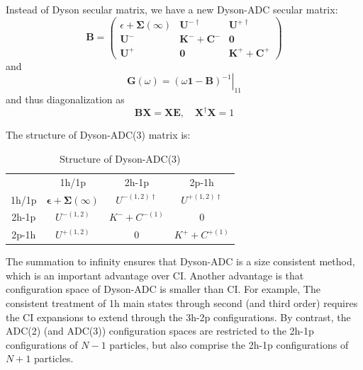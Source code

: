 Instead of Dyson secular matrix, we have a new Dyson-ADC secular matrix:
\begin{equation}
	\boldsymbol{B}=\left( \begin{array}{ccc}{\epsilon+\mathbf{\Sigma}(\infty)} & {\boldsymbol{U}^{-\dagger}} & {\boldsymbol{U}^{+\dagger}} \\ {\boldsymbol{U}^{-}} & {\boldsymbol{K}^{-}+\boldsymbol{C}^{-}} & {\mathbf{0}} \\ {\boldsymbol{U}^{+}} & {\boldsymbol{0}} & {\boldsymbol{K}^{+}+\boldsymbol{C}^{+}}\end{array}\right)
\end{equation}
and
\begin{equation}
	\boldsymbol{G}(\omega)=\left.(\omega \mathbf{1}-\boldsymbol{B})^{-1}\right|_{11}
\end{equation}
and thus diagonalization as
\begin{equation}
	\boldsymbol{B} \boldsymbol{X}=\boldsymbol{X} \boldsymbol{E}, \quad \boldsymbol{X}^{\dagger} \boldsymbol{X}=1
\end{equation}

The structure of Dyson-ADC(3) matrix is:
\begin{table}
	\centering
	\caption{Structure of Dyson-ADC(3)}
\begin{tabular}{cccc}
                           & 1h/1p                                                                    & 2h-1p                                    & 2p-1h                                      \\ \cline{2-4} 
\multicolumn{1}{c|}{1h/1p} & \multicolumn{1}{c|}{$\boldsymbol{\epsilon}+\boldsymbol{\Sigma}(\infty)$} & \multicolumn{1}{c|}{$U^{-(1,2)\dagger}$} & \multicolumn{1}{c|}{$ U^{+(1,2)\dagger} $} \\ \cline{2-4} 
\multicolumn{1}{c|}{2h-1p} & \multicolumn{1}{c|}{$U^{-(1,2)}$}                                        & \multicolumn{1}{c|}{$K^{-}+C^{-(1)}$}    & \multicolumn{1}{c|}{0}                     \\ \cline{2-4} 
\multicolumn{1}{c|}{2p-1h} & \multicolumn{1}{c|}{$U^{+(1,2)}$}                                        & \multicolumn{1}{c|}{0}                   & \multicolumn{1}{c|}{$K^{+}+C^{+(1)}$}      \\ \cline{2-4} 
\end{tabular}
\end{table}

The summation to infinity ensures that Dyson-ADC is a size consistent method, which is an important advantage over CI.
Another advantage is that configuration space of Dyson-ADC is smaller than CI.
For example, The consistent treatment of 1h main states through second (and third order) requires the CI expansions to extend through the 3h-2p configurations.
By contrast, the ADC(2) (and ADC(3)) configuration spaces are restricted to the 2h-1p configurations of $N−1$ particles, but also comprise the 2h-1p configurations of $N+1$ particles.

